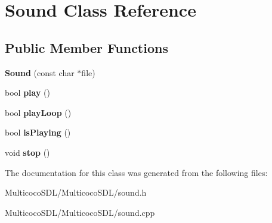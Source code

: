 \hypertarget{class_sound}{\section{Sound Class Reference}
\label{class_sound}
}
\subsection*{Public Member Functions}
\begin{DoxyCompactItemize}
\item 
\hypertarget{class_sound_ae40758824408ca575a415dc99c4ff65f}{{\bfseries Sound} (const char $\ast$file)}\label{class_sound_ae40758824408ca575a415dc99c4ff65f}

\item 
\hypertarget{class_sound_a55b8e185d9c9014a26d36fdbc760993b}{bool {\bfseries play} ()}\label{class_sound_a55b8e185d9c9014a26d36fdbc760993b}

\item 
\hypertarget{class_sound_a167acf125385f6167eec534b9a164bf5}{bool {\bfseries play\-Loop} ()}\label{class_sound_a167acf125385f6167eec534b9a164bf5}

\item 
\hypertarget{class_sound_a3c393edeae934ea77f8af6b7c660614e}{bool {\bfseries is\-Playing} ()}\label{class_sound_a3c393edeae934ea77f8af6b7c660614e}

\item 
\hypertarget{class_sound_a07c551ab56d2f83a861a2f7fd81b480a}{void {\bfseries stop} ()}\label{class_sound_a07c551ab56d2f83a861a2f7fd81b480a}

\end{DoxyCompactItemize}


The documentation for this class was generated from the following files\-:\begin{DoxyCompactItemize}
\item 
Multicoco\-S\-D\-L/\-Multicoco\-S\-D\-L/sound.\-h\item 
Multicoco\-S\-D\-L/\-Multicoco\-S\-D\-L/sound.\-cpp\end{DoxyCompactItemize}
